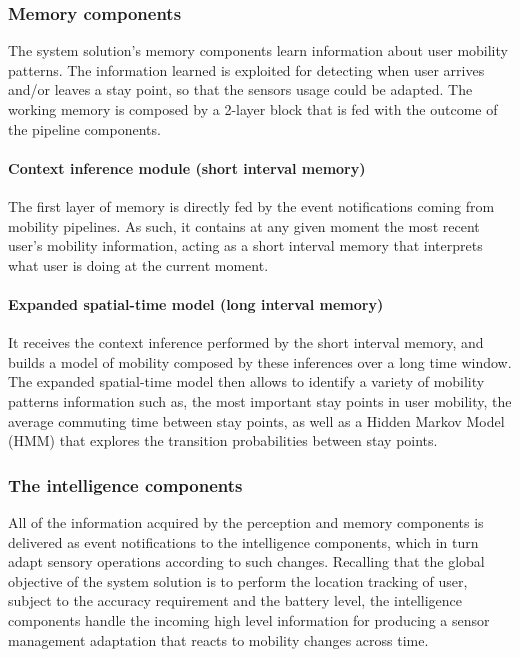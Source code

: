 \documentclass[ENG,PhD]{cinvestav}
\begin{document}
\subsubsection{Memory components}
The system solution's memory components learn information about user mobility patterns.
The information learned is exploited for detecting when user arrives and/or leaves a stay point, so that the sensors usage could be adapted.
The working memory is composed by a 2-layer block that is fed with the outcome of the pipeline components.

\paragraph{Context inference module (short interval memory)}
The first layer of memory is directly fed by the event notifications coming from mobility pipelines.
As such, it contains at any given moment the most recent user's mobility information, acting as a short interval memory that interprets what user is doing at the current moment.

\paragraph{Expanded spatial-time model (long interval memory)}
It receives the context inference performed by the short interval memory, and builds a model of mobility composed by these inferences over a long time window.
The expanded spatial-time model then allows to identify a variety of mobility patterns information such as, the most important stay points in user mobility, the average commuting time between stay points, as well as a Hidden Markov Model (HMM) that explores the transition probabilities between stay points.

\subsubsection{The intelligence components}
All of the information acquired by the perception and memory components is delivered as event notifications to the intelligence components, which in turn adapt sensory operations according to such changes.
Recalling that the global objective of the system solution is to perform the location tracking of user, subject to the accuracy requirement and the battery level, the intelligence components handle the incoming high level information for producing a sensor management adaptation that reacts to mobility changes across time.
\end{document}
